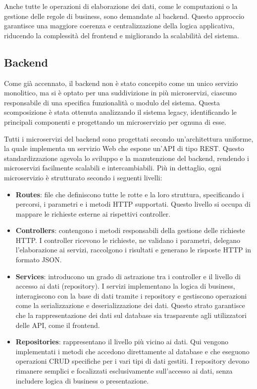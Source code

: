 Anche tutte le operazioni di elaborazione dei dati, come le computazioni o la gestione delle regole di business, sono demandate al backend. Questo approccio garantisce una maggiore coerenza e centralizzazione della logica applicativa, riducendo la complessità del frontend e migliorando la scalabilità del sistema.

\subsection{Backend}
Come già accennato, il backend non è stato concepito come un unico servizio monolitico, ma si è optato per una suddivizione in più microservizi, ciascuno responsabile di una specifica funzionalità o modulo del sistema. Questa scomposizione è stata ottenuta analizzando il sistema legacy, identificando le principali componenti e progettando un microservizio per ognuna di esse.

Tutti i microservizi del backend sono progettati secondo un'architettura uniforme, la quale implementa un servizio Web che espone un'API di tipo REST. Questo standardizzazione agevola lo sviluppo e la manutenzione del backend, rendendo i microservizi facilmente scalabili e intercambiabili. Più in dettaglio, ogni microservizio è strutturato secondo i seguenti livelli:

\begin{itemize}
  \item \textbf{Routes}: file che definiscono tutte le rotte e la loro struttura, specificando i percorsi, i parametri e i metodi HTTP supportati. Questo livello si occupa di mappare le richieste esterne ai rispettivi controller.

  \item \textbf{Controllers}: contengono i metodi responsabili della gestione delle richieste HTTP. I controller ricevono le richieste, ne validano i parametri, delegano l'elaborazione ai servizi, raccolgono i risultati e generano le risposte HTTP in formato JSON.

  \item \textbf{Services}: introducono un grado di astrazione tra i controller e il livello di accesso ai dati (repository). I servizi implementano la logica di business, interagiscono con la base di dati tramite i repository e gestiscono operazioni come la serializzazione e deserializzazione dei dati. Questo strato garantisce che la rappresentazione dei dati sul database sia trasparente agli utilizzatori delle API, come il frontend.

  \item \textbf{Repositories}: rappresentano il livello più vicino ai dati. Qui vengono implementati i metodi che accedono direttamente al database e che eseguono operazioni CRUD specifiche per i vari tipi di dati gestiti. I repository devono rimanere semplici e focalizzati esclusivamente sull'accesso ai dati, senza includere logica di business o presentazione.
\end{itemize}

